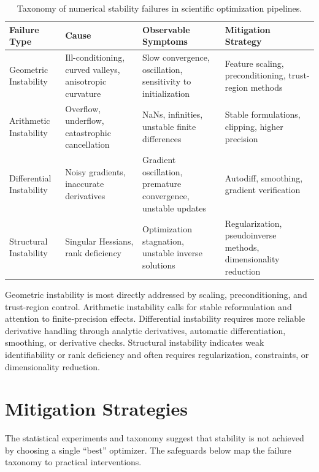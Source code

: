\begin{table}
\centering
\begin{tabular}{p{3cm} p{3.5cm} p{3.5cm} p{3.5cm}}
\hline
\textbf{Failure Type} & \textbf{Cause} & \textbf{Observable Symptoms} & \textbf{Mitigation Strategy} \\
\hline
Geometric Instability &
Ill-conditioning, curved valleys, anisotropic curvature &
Slow convergence, oscillation, sensitivity to initialization &
Feature scaling, preconditioning, trust-region methods \\

Arithmetic Instability &
Overflow, underflow, catastrophic cancellation &
NaNs, infinities, unstable finite differences &
Stable formulations, clipping, higher precision \\

Differential Instability &
Noisy gradients, inaccurate derivatives &
Gradient oscillation, premature convergence, unstable updates &
Autodiff, smoothing, gradient verification \\

Structural Instability &
Singular Hessians, rank deficiency &
Optimization stagnation, unstable inverse solutions &
Regularization, pseudoinverse methods, dimensionality reduction \\
\hline
\end{tabular}
\caption{Taxonomy of numerical stability failures in scientific optimization pipelines.}
\label{tab:taxonomy}
\end{table}

Geometric instability is most directly addressed by scaling, preconditioning, and trust-region control. Arithmetic instability calls for stable reformulation and attention to finite-precision effects. Differential instability requires more reliable derivative handling through analytic derivatives, automatic differentiation, smoothing, or derivative checks. Structural instability indicates weak identifiability or rank deficiency and often requires regularization, constraints, or dimensionality reduction.

\section{Mitigation Strategies}
\label{sec:mitigation-strategies}

The statistical experiments and taxonomy suggest that stability is not achieved by choosing a single ``best'' optimizer. The safeguards below map the failure taxonomy to practical interventions.

